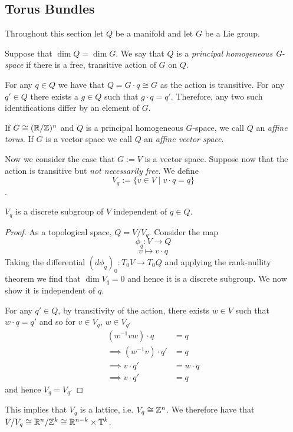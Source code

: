 \subsection{Torus Bundles}
Throughout this section let $Q$ be a manifold and let $G$ be a Lie group.
\begin{definition}
    Suppose that $\dim Q = \dim G$. We say that $Q$ is a \emph{principal
        homogeneous G-space} if there is a free, transitive action of $G$ on $Q$.
\end{definition}
\begin{remark}
    For any $q \in Q$ we have that $Q = G\cdot q \cong G$ as the action is transitive. For any $q' \in Q$ there exists a $g \in Q$
    such that $g \cdot q = q'$. Therefore, any two such identifications differ by an element of $G$.
\end{remark}
\begin{definition}
    If $G \cong (\mathbb{R} / \mathbb{Z})^n$ and $Q$ is a principal
    homogeneous $G$-space, we call $Q$ an \emph{affine torus}. If $G$ is a vector space we call $Q$ an \emph{affine vector space}.
\end{definition}

Now we consider the case that $G:=V$ is a vector space. Suppose now that the
action is transitive but \emph{not necessarily free}. We define $$V_q := \{v
    \in V \mid v \cdot q = q\}$$.
\begin{prop}
    $V_q$ is a discrete subgroup of $V$ independent of $q \in Q$.
\end{prop}
\begin{proof}
    As a topological space, $Q = V/V_q$. Consider the map
    $$
        \phi_q : V \to Q
    $$
    $$ v \mapsto v \cdot q$$
    Taking the differential $(d\phi_q)_0 : T_0 V \to T_0Q$ and applying the rank-nullity theorem
    we find that $\dim V_q = 0$ and hence it is a discrete subgroup. We now show it is independent of $q$.

    For any $q' \in Q$, by transitivity of the action, there exists $w \in V$ such
    that $w \cdot q = q'$ and so for $v \in V_q$, $w \in V_{q'}$
    \begin{align*}
        (w^{-1}vw)\cdot q           & = q        \\
        \implies (w^{-1}v) \cdot q' & = q        \\
        \implies   v \cdot q'       & = w\cdot q \\
        \implies v \cdot q'         & = q
    \end{align*}
    and hence $V_q = V_{q'}$
\end{proof}
\begin{remark}\label{rem:torus-structure}
    This implies that $V_q$ is a lattice, i.e. $V_q \cong \mathbb{Z}^n$. We therefore have that $V/V_q \cong \mathbb{R}^n / \mathbb{Z}^k \cong \mathbb{R}^{n-k} \times \mathbb{T}^k$.
\end{remark}

